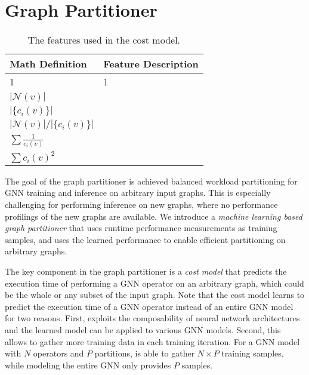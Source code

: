 \section{Graph Partitioner}
\label{sec:partition}
\begin{table}
\caption{The features used in the cost model.}
\begin{tabular}{|l|l|}
\hline
{\bf Math Definition} & {\bf Feature Description} \\
\hline
1 & 1 \\
$|\mathcal{N}(v)|$ & \\
$|\{c_i(v)\}|$ &  \\
$|\mathcal{N}(v)| / |\{c_i(v)\}|$ & \\
$\sum{\frac{1}{c_i(v)}}$ & \\
$\sum{c_i(v)^2}$ & \\
\hline
\end{tabular}
\end{table}

The goal of the \Sys graph partitioner is achieved balanced workload partitioning for GNN training and inference on arbitrary input graphs.
This is especially challenging for performing inference on new graphs, where no performance profilings of the new graphs are available.
We introduce a {\em machine learning based graph partitioner} that uses runtime performance measurements as training samples, and uses the learned performance to enable efficient partitioning on arbitrary graphs. 

The key component in the \Sys graph partitioner is a {\em cost model} that predicts the execution time of performing a GNN operator on an arbitrary graph, which could be the whole or any subset of the input graph.
%
Note that the cost model learns to predict the execution time of a GNN operator instead of an entire GNN model for two reasons.
First, \Sys exploits the composability of neural network architectures and the learned model can be applied to various GNN models.
Second, this allows \Sys to gather more training data in each training iteration. 
For a GNN model with $N$ operators and $P$ partitions, \Sys is able to gather $N\times P$ training samples, while modeling the entire GNN only provides $P$ samples.

